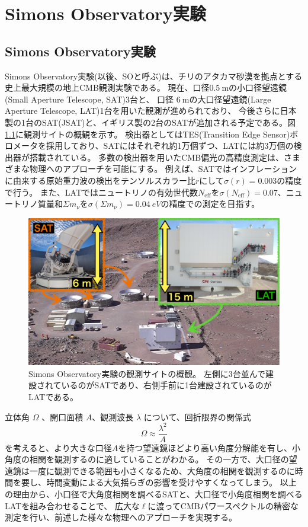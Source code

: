\documentclass[../../main.tex]{subfiles}
\begin{document}
\chapter{Simons Observatory実験}
\section{Simons Observatory実験}
Simons Observatory実験(以後、SOと呼ぶ)は、チリのアタカマ砂漠を拠点とする史上最大規模の地上CMB観測実験である。
現在、口径$0.5\ \mathrm{m}$の小口径望遠鏡(Small Aperture Telescope, SAT)3台と、
口径 $6\ \mathrm{m}$の大口径望遠鏡(Large Aperture Telescope, LAT)1台を用いた観測が進められており\cite{so:current_status}、
今後さらに日本製の1台のSAT(JSAT)と、イギリス製の2台のSATが追加される予定である。図\ref{fig:so_site}に観測サイトの概観を示す。
検出器としてはTES(Transition Edge Sensor)ボロメータを採用しており、SATにはそれぞれ約1万個ずつ、LATには約3万個の検出器が搭載されている。
多数の検出器を用いたCMB偏光の高精度測定は、さまざまな物理へのアプローチを可能にする。
例えば、SATではインフレーションに由来する原始重力波の検出をテンソルスカラー比$r$にして$\sigma(r)=0.003$の精度で行う。
また、LATではニュートリノの有効世代数$N_\mathrm{eff}$を$\sigma(N_{\mathrm{eff}})=0.07$、ニュートリノ質量和$\Sigma m_\nu$を$\sigma(\Sigma m_\nu)=\SI{0.04}{eV}$の精度での測定を目指す\cite{so:science_forecast}。
\begin{figure}[H]
    \centering
    \includegraphics[width=1.0\textwidth]{simons_observatory/so_site.pdf}
    \caption{Simons Observatory実験の観測サイトの概観。
    左側に3台並んで建設されているのがSATであり、右側手前に1台建設されているのがLATである。}
    \label{fig:so_site}
\end{figure}

立体角 $\Omega$ 、開口面積 $A$、観測波長 $\lambda$ について、回折限界の関係式\cite{text_radioastro}
\begin{equation}
    \Omega \approx \dfrac{\lambda^2}{A}
\end{equation}
を考えると、より大きな口径$A$を持つ望遠鏡ほどより高い角度分解能を有し、小角度の相関を観測するのに適していることがわかる。
その一方で、大口径の望遠鏡は一度に観測できる範囲も小さくなるため、大角度の相関を観測するのに時間を要し、時間変動による大気揺らぎの影響を受けやすくなってしまう。
以上の理由から、小口径で大角度相関を調べるSATと、大口径で小角度相関を調べるLATを組み合わせることで、
広大な$\ell$に渡ってCMBパワースペクトルの精密な測定を行い、前述した様々な物理へのアプローチを実現する。
\end{document}
